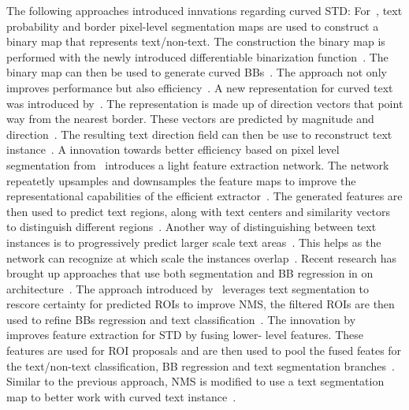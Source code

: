 The following approaches introduced innvations regarding curved \ac{STD}:
For~\cite{liao_real-time_2019}, text probability and border pixel-level segmentation maps are used
to construct a binary map that represents text/non-text.
The construction the binary map is performed with the newly introduced differentiable binarization
function~\citep{liao_real-time_2019}.
The binary map can then be used to generate curved \acp{BB}~\citep{liao_real-time_2019}.
The approach not only improves performance but also efficiency~\citep{liao_real-time_2019}.
A new representation for curved text was introduced by~\cite{xu_textfield_2019}.
The representation is made up of direction vectors that point way from the nearest border.
These vectors are predicted by magnitude and direction~\citep{xu_textfield_2019}.
The resulting text direction field can then be use to reconstruct text
instance~\citep{xu_textfield_2019}.
A innovation towards better efficiency based on pixel level segmentation
from~\cite{wang_efficient_2019} introduces a light feature extraction network.
The network repeatetly upsamples and downsamples the feature maps to improve the representational
capabilities of the efficient extractor~\citep{wang_efficient_2019}.
The generated features are then used to predict text regions, along with text centers and similarity
vectors to distinguish different regions~\citep{wang_efficient_2019}.
Another way of distinguishing between text instances is to progressively predict larger scale text
areas~\citep{wang_shape_2019}.
This helps as the network can recognize at which scale the instances overlap~\citep{wang_shape_2019}.
Recent research has brought up approaches that use both segmentation and \ac{BB} regression in on
architecture~\citep{xie_scene_2018,dai_fused_2018}.
The approach introduced by~\cite{xie_scene_2018} leverages text segmentation to rescore certainty
for predicted \acp{ROI} to improve \ac{NMS}, the filtered \acp{ROI} are then used to refine
\acp{BB} regression and text classification~\citep{xie_scene_2018}.
The innovation by~\cite{dai_fused_2018} improves feature extraction for \ac{STD} by fusing lower-
level features.
These features are used for \ac{ROI} proposals and are then used to pool the fused feates for
the text/non-text classification, \ac{BB} regression and text segmentation
branches~\citep{dai_fused_2018}.
Similar to the previous approach, \ac{NMS} is modified to use a text segmentation map to better
work with curved text instance~\citep{dai_fused_2018,xie_scene_2018}.

